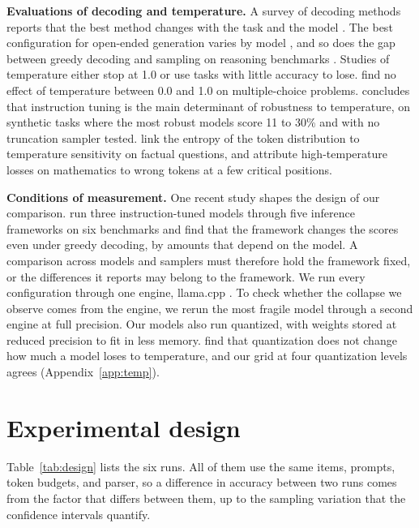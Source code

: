\documentclass[10pt]{article}
\begin{document}
\textbf{Evaluations of decoding and temperature.} A survey of decoding methods reports that
the best method changes with the task and the model \citep{shi2024decoding}. The best configuration for
open-ended generation varies by model \citep{garcesarias2025decoding}, and so does the gap
between greedy decoding and sampling on reasoning benchmarks \citep{song2024goodbad}. Studies
of temperature either stop at 1.0 or use tasks with little accuracy to lose.
\citet{renze2024temperature} find no effect of temperature between 0.0 and 1.0 on
multiple-choice problems. \citet{grover2026reliability} concludes that instruction tuning is
the main determinant of robustness to temperature, on synthetic tasks where the most robust
models score 11 to 30\% and with no truncation sampler tested. \citet{fastowski2025confidence}
link the entropy of the token distribution to temperature sensitivity on factual questions,
and \citet{troshin2025temperature} attribute high-temperature losses on mathematics to wrong
tokens at a few critical positions.

\textbf{Conditions of measurement.} One recent study shapes the design of our comparison.
\citet{masoudian2026backend} run three instruction-tuned models through five inference
frameworks on six benchmarks and find that the framework changes the scores even under greedy
decoding, by amounts that depend on the model. A comparison across models and samplers must
therefore hold the framework fixed, or the differences it reports may belong to the framework.
We run every configuration through one engine, llama.cpp \citep{gerganov2023llamacpp}. To check whether the collapse we
observe comes from the engine, we rerun the most fragile model through a second engine at full
precision. Our models also run quantized, with weights stored at reduced precision to fit in less memory.
\citet{prasad2026quantization} find that quantization
does not change how much a model loses to temperature, and our grid at four quantization
levels agrees (Appendix~\ref{app:temp}).

\section{Experimental design}
\label{sec:design}

Table~\ref{tab:design} lists the six runs. All of them use the same items, prompts, token
budgets, and parser, so a difference in accuracy between two runs comes from the factor that
differs between them, up to the sampling variation that the confidence intervals quantify.
\end{document}
